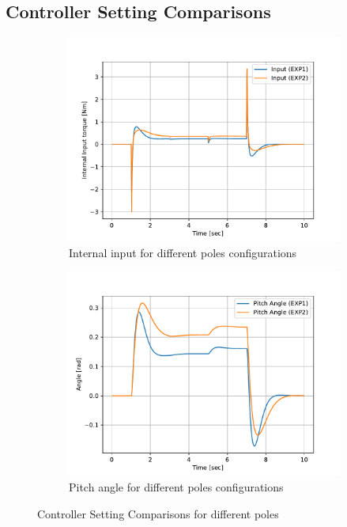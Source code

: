 \subsection{Controller Setting Comparisons}
\begin{figure}[h]
    \centering
    \begin{subfigure}[t]{0.45\textwidth}
        \includegraphics[width=\textwidth]{Controller Setting Comparisons}
        \caption{Internal input for different poles configurations}
        \label{fig:Internal input for different poles configurations}
    \end{subfigure}
    \begin{subfigure}[t]{0.45\textwidth}
        \includegraphics[width=\textwidth]{Controller Setting Comparisons_theta}
        \caption{Pitch angle for different poles configurations}
        \label{fig:Pitch angle for different poles configurations}
    \end{subfigure}
    \caption{Controller Setting Comparisons for different poles}
    \label{fig:Controller Setting Comparisons for different poles}
\end{figure}
